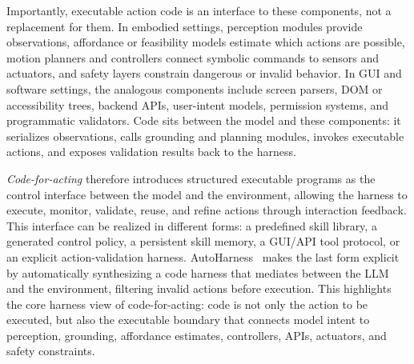 Importantly, executable action code is an interface to these
components, not a replacement for them. In embodied settings,
perception modules provide observations, affordance or feasibility
models estimate which actions are possible, motion planners and
controllers connect symbolic commands to sensors and actuators,
and safety layers constrain dangerous or invalid behavior. In GUI
and software settings, the analogous components include screen
parsers, DOM or accessibility trees, backend APIs, user-intent
models, permission systems, and programmatic validators. Code sits
between the model and these components: it serializes observations,
calls grounding and planning modules, invokes executable actions,
and exposes validation results back to the harness.

\textit{Code-for-acting} therefore introduces structured
executable programs as the control interface between the model
and the environment, allowing the harness to execute, monitor,
validate, reuse, and refine actions through interaction feedback.
This interface can be realized in different forms: a predefined
skill library, a generated control policy, a persistent skill
memory, a GUI/API tool protocol, or an explicit action-validation
harness. AutoHarness~\cite{lou2026autoharnessimprovingllmagents}
makes the last form explicit by automatically synthesizing a code
harness that mediates between the LLM and the environment,
filtering invalid actions before execution. This highlights the
core harness view of code-for-acting: code is not only the action
to be executed, but also the executable boundary that connects
model intent to perception, grounding, affordance estimates,
controllers, APIs, actuators, and safety constraints.




